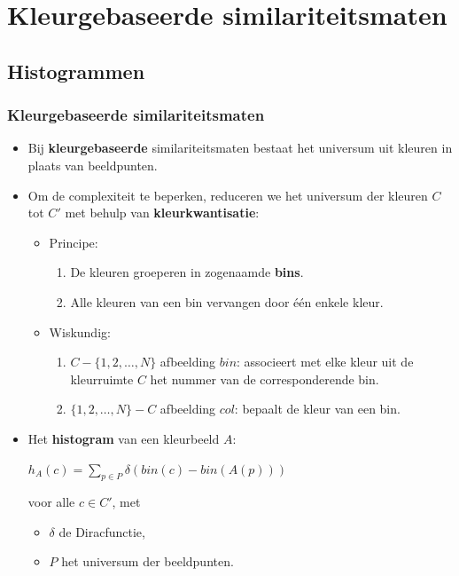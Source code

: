 \documentclass[dutch]{beamer}
\theoremstyle{definition}
\theoremstyle{remark}
\theoremstyle{example}
\begin{document}
\section{Kleurgebaseerde similariteitsmaten}
\subsection{Histogrammen}
\frame
{
  \frametitle{Kleurgebaseerde similariteitsmaten}

  \begin{itemize}
  \item Bij \textbf{kleurgebaseerde} similariteitsmaten bestaat het universum
  uit kleuren in plaats van beeldpunten. 
  \item Om de complexiteit te beperken,
  reduceren we het universum der kleuren $C$ tot $C'$ met behulp van
  \textbf{kleurkwantisatie}:
  \begin{itemize}
  \item Principe:
  \begin{enumerate}
   \item De kleuren groeperen in zogenaamde \textbf{bins}.
   \item Alle kleuren van een bin vervangen door \'e\'en enkele kleur.
  \end{enumerate}
  \item Wiskundig:
  \begin{enumerate}
    \item $C - \{1,2,\ldots,N\}$ afbeelding $bin$: associeert met elke kleur uit de
    kleurruimte $C$ het nummer van de corresponderende bin.
    \item $\{1,2,\ldots,N\} - C$ afbeelding $col$: bepaalt de kleur van een bin.
  \end{enumerate}
  \end{itemize}
  \item Het \textbf{histogram} van een kleurbeeld $A$:
  \begin{minipage}{\textwidth}
  \vspace{4pt}
  \centering
  $\displaystyle h_A(c) = \sum_{p \in P} \delta (bin(c) - bin(A(p)))$
  \end{minipage} 
  voor alle $c\in C'$, met 
  \begin{itemize}
    \item $\delta$ de Diracfunctie, 
    \item $P$ het universum der beeldpunten.
  \end{itemize}
  \end{itemize}
}
\end{document}
